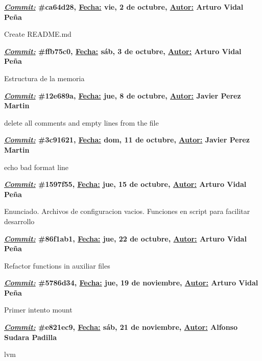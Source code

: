 \item \textbf{\underline{\textit{Commit:}} \#ca64d28, \underline{Fecha:} vie,  2 de octubre, \underline{Autor:} Arturo Vidal Peña}\\\item[] Create README.md\\
\item \textbf{\underline{\textit{Commit:}} \#ffb75c0, \underline{Fecha:} sáb,  3 de octubre, \underline{Autor:} Arturo Vidal Peña}\\\item[] Estructura de la memoria\\
\item \textbf{\underline{\textit{Commit:}} \#12e689a, \underline{Fecha:} jue,  8 de octubre, \underline{Autor:} Javier Perez Martin}\\\item[] delete all comments and empty lines from the file\\
\item \textbf{\underline{\textit{Commit:}} \#3c91621, \underline{Fecha:} dom, 11 de octubre, \underline{Autor:} Javier Perez Martin}\\\item[] echo bad format line\\
\item \textbf{\underline{\textit{Commit:}} \#1597f55, \underline{Fecha:} jue, 15 de octubre, \underline{Autor:} Arturo Vidal Peña}\\\item[] Enunciado. Archivos de configuracion vacios. Funciones en script para facilitar desarrollo\\
\item \textbf{\underline{\textit{Commit:}} \#86f1ab1, \underline{Fecha:} jue, 22 de octubre, \underline{Autor:} Arturo Vidal Peña}\\\item[] Refactor functions in auxiliar files\\
\item \textbf{\underline{\textit{Commit:}} \#5786d34, \underline{Fecha:} jue, 19 de noviembre, \underline{Autor:} Arturo Vidal Peña}\\\item[] Primer intento mount\\
\item \textbf{\underline{\textit{Commit:}} \#e821ec9, \underline{Fecha:} sáb, 21 de noviembre, \underline{Autor:} Alfonso Sudara Padilla}\\\item[] lvm\\
